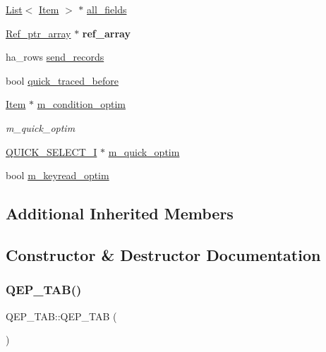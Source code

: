 \begin{DoxyCompactItemize}
\mbox{\hyperlink{classList}{List}}$<$ \mbox{\hyperlink{classItem}{Item}} $>$ $\ast$ \mbox{\hyperlink{classQEP__TAB_a0707d5142158b844cbc095219f5d29cf}{all\+\_\+fields}}
\item 
\mbox{\label{classQEP__TAB_a19c92cb4b0f999f772d011525b9c17eb}} 
\mbox{\hyperlink{classBounds__checked__array}{Ref\+\_\+ptr\+\_\+array}} $\ast$ {\bfseries ref\+\_\+array}
\item 
ha\+\_\+rows \mbox{\hyperlink{classQEP__TAB_ae98307c110eb577934f1da5a6d4f3aaa}{send\+\_\+records}}
\item 
bool \mbox{\hyperlink{classQEP__TAB_a27b20c80a18d0ddea41aab12759e4c65}{quick\+\_\+traced\+\_\+before}}
\item 
\mbox{\label{classQEP__TAB_a2beab2f5876da20af6a99f2d38ae67f6}} 
\mbox{\hyperlink{classItem}{Item}} $\ast$ \mbox{\hyperlink{classQEP__TAB_a2beab2f5876da20af6a99f2d38ae67f6}{m\+\_\+condition\+\_\+optim}}
\begin{DoxyCompactList}\small\item\em m\+\_\+quick\+\_\+optim \end{DoxyCompactList}\item 
\mbox{\hyperlink{classQUICK__SELECT__I}{Q\+U\+I\+C\+K\+\_\+\+S\+E\+L\+E\+C\+T\+\_\+I}} $\ast$ \mbox{\hyperlink{classQEP__TAB_a8bb3c3a8392cc5ec76f23e7bac67347d}{m\+\_\+quick\+\_\+optim}}
\item 
bool \mbox{\hyperlink{classQEP__TAB_a977193c0d8769cd161379871d5b138a1}{m\+\_\+keyread\+\_\+optim}}
\end{DoxyCompactItemize}
\subsection*{Additional Inherited Members}


\subsection{Constructor \& Destructor Documentation}
\mbox{\label{classQEP__TAB_a8d6de370a4036642fa57cd2554f8758b}} 
\subsubsection{\texorpdfstring{Q\+E\+P\+\_\+\+T\+A\+B()}{QEP\_TAB()}}
{\footnotesize\ttfamily Q\+E\+P\+\_\+\+T\+A\+B\+::\+Q\+E\+P\+\_\+\+T\+AB (\begin{DoxyParamCaption}{ }\end{DoxyParamCaption})\hspace{0.3cm}{\ttfamily [inline]}}

